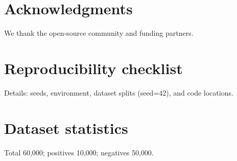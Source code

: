 \documentclass[conference]{IEEEtran}
\begin{document}
\section*{Acknowledgments}
We thank the open-source community and funding partners.




\appendices
\section{Reproducibility checklist}
Details: seeds, environment, dataset splits (seed=42), and code locations.

\section{Dataset statistics}
Total 60,000; positives 10,000; negatives 50,000.
\end{document}

